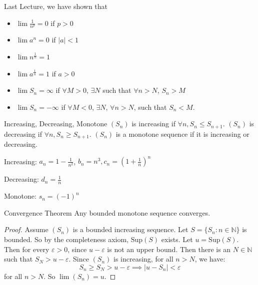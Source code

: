 \documentclass{report}
\begin{document}
Last Lecture, we have shown that
    \begin{itemize}
        \item  $\lim \frac{1}{n^{p}} = 0$ if $p > 0$

        \item  $\lim a^{n} = 0$ if $\lvert a \rvert < 1$

        \item  $\lim n^{\frac{1}{n}} = 1$

        \item $\lim a^{\frac{1}{n}} = 1$ if $a > 0$

        \item $\lim S_{n} = \infty$ if $\forall M >  0$, $\exists N$ such that $\forall n > N$, $S_{n} > M$

        \item $\lim S_{n} = -\infty$ if $\forall M < 0$, $\exists N$, $\forall n> N$, such that $S_{n} < M$. 
    \end{itemize}
\begin{definition}{Increasing, Decreasing, Monotone}
    $(S_{n})$ is increasing if $\forall n, S_{n} \leq S_{n + 1}$. $(S_{n})$ is decreasing if $\forall n, S_{n} \geq S_{n + 1}$. $(S_{n})$ is a monotone sequence if it is increasing or decreasing.
\end{definition}

\begin{examples}
    \begin{example}
        Increasing: $a_{n} = 1 - \frac{1}{n^{2}}$, $b_{n} = n^{3}, c_{n} = (1 + \frac{1}{n})^{n}$
    \end{example}
    \begin{example}
        Decreasing: $d_{n} = \frac{1}{n}$
    \end{example}
    \begin{example}
        Monotone: $s_{n} = (-1)^{n}$
    \end{example}
\end{examples}

\begin{theorem}{Convergence Theorem}
    Any bounded monotone sequence converges.
\end{theorem}
    \begin{proof}
        Assume $(S_{n})$ is a bounded increasing sequence. Let $S = \{S_{n}: n \in \mathbb{N}\}$ is bounded. So by the completeness axiom, $\text{Sup}(S)$ exists. Let $u = \text{Sup}(S)$. Then for every $\varepsilon > 0$, since $u - \varepsilon$ is not an upper bound. Then there is an $N \in \mathbb{N}$ such that $S_{N} >  u - \varepsilon$. Since $(S_{n})$ is increasing, for all $n > N$, we have:
            \begin{equation*}
                S_{n} \geq S_{N} > u - \varepsilon \implies \lvert u - S_{n} \rvert < \varepsilon
            \end{equation*}
        for all $n > N$. So $\lim (S_{n}) = u$.
    \end{proof}
\end{document}
